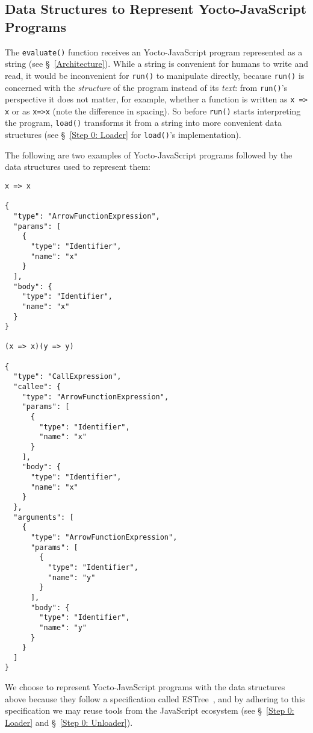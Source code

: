 \documentclass[12pt, oneside]{book}
\begin{document}
\subsection{Data Structures to Represent Yocto-JavaScript Programs}
\label{Data Structures to Represent Yocto-JavaScript Programs}

The \texttt{evaluate()} function receives an Yocto-JavaScript program represented as a string (see §~\ref{Architecture}). While a string is convenient for humans to write and read, it would be inconvenient for \texttt{run()} to manipulate directly, because \texttt{run()} is concerned with the \emph{structure} of the program instead of its \emph{text}: from \texttt{run()}’s perspective it does not matter, for example, whether a function is written as \texttt{x => x} or as \texttt{x=>x} (note the difference in spacing). So before \texttt{run()} starts interpreting the program, \texttt{load()} transforms it from a string into more convenient data structures (see §~\ref{Step 0: Loader} for \texttt{load()}’s implementation).

The following are two examples of Yocto-JavaScript programs followed by the data structures used to represent them:

\begin{verbatim}
x => x

{
  "type": "ArrowFunctionExpression",
  "params": [
    {
      "type": "Identifier",
      "name": "x"
    }
  ],
  "body": {
    "type": "Identifier",
    "name": "x"
  }
}

(x => x)(y => y)

{
  "type": "CallExpression",
  "callee": {
    "type": "ArrowFunctionExpression",
    "params": [
      {
        "type": "Identifier",
        "name": "x"
      }
    ],
    "body": {
      "type": "Identifier",
      "name": "x"
    }
  },
  "arguments": [
    {
      "type": "ArrowFunctionExpression",
      "params": [
        {
          "type": "Identifier",
          "name": "y"
        }
      ],
      "body": {
        "type": "Identifier",
        "name": "y"
      }
    }
  ]
}
\end{verbatim}

We choose to represent Yocto-JavaScript programs with the data structures above because they follow a specification called ESTree~\cite{estree}, and by adhering to this specification we may reuse tools from the JavaScript ecosystem (see §~\ref{Step 0: Loader} and §~\ref{Step 0: Unloader}).
\end{document}
